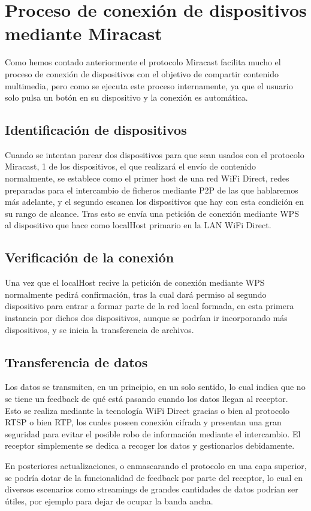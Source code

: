 \section{Proceso de conexión de dispositivos mediante Miracast}

Como hemos contado anteriormente el protocolo Miracast facilita mucho el proceso de conexión de dispositivos con el objetivo de compartir contenido multimedia, pero como se ejecuta este proceso internamente, ya que el usuario solo pulsa un botón en su dispositivo y la conexión es automática.

\subsection{Identificación de dispositivos}

Cuando se intentan parear dos dispositivos para que sean usados con el protocolo Miracast, 1 de los dispositivos, el que realizará el envío de contenido normalmente, se establece como el primer host de una red WiFi Direct, redes preparadas para el intercambio de ficheros mediante P2P de las que hablaremos más adelante, y el segundo escanea los dispositivos que hay con esta condición en su rango de alcance. Tras esto se envía una petición de conexión mediante WPS al dispositivo que hace como localHost primario en la LAN WiFi Direct.

\subsection{Verificación de la conexión}

Una vez que el localHost recive la petición de conexión mediante WPS normalmente pedirá confirmación, tras la cual dará permiso al segundo dispositivo para entrar a formar parte de la red local formada, en esta primera instancia por dichos dos dispositivos, aunque se podrían ir incorporando más dispositivos, y se inicia la transferencia de archivos.

\subsection{Transferencia de datos}

Los datos se transmiten, en un principio, en un solo sentido, lo cual indica que no se tiene un feedback de qué está pasando cuando los datos llegan al receptor. Esto se realiza mediante la tecnología WiFi Direct gracias o bien al protocolo RTSP o bien RTP, los cuales poseen conexión cifrada y presentan una gran seguridad para evitar el posible robo de información mediante el intercambio. El receptor simplemente se dedica a recoger los datos y gestionarlos debidamente.

En posteriores actualizaciones, o enmascarando el protocolo en una capa superior, se podría dotar de la funcionalidad de feedback por parte del receptor, lo cual en diversos escenarios como streamings de grandes cantidades de datos podrían ser útiles, por ejemplo para dejar de ocupar la banda ancha.
